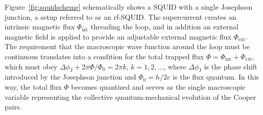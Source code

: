 \documentclass[3p,sort&compress]{elsarticle}
\begin{document}
Figure~\ref{fig:squidscheme} schematically shows a SQUID with a single Josephson junction, a setup referred to as an rf-SQUID. The supercurrent creates an intrinsic magnetic flux $\Phi_\text{int}$ threading the loop, and in addition an external magnetic field is applied to provide an adjustable external magnetic flux $\Phi_\text{ext}$. The requirement that the macroscopic wave function around the loop must be continuous translates into a condition for the total trapped flux $\Phi=\Phi_\text{int}+ \Phi_\text{ext}$, which must obey $\Delta \phi_\text{J} + 2\pi \Phi/\Phi_0 = 2\pi k$, $k=1,2,\hdots$, where $\Delta \phi_\text{J}$ is the phase shift introduced by the Josephson junction and $\Phi_0=h/2e$ is the flux quantum. In this way, the total flux $\Phi$ becomes quantized and serves as the single macroscopic variable representing the collective quantum-mechanical evolution of the Cooper pairs. 
\end{document}
